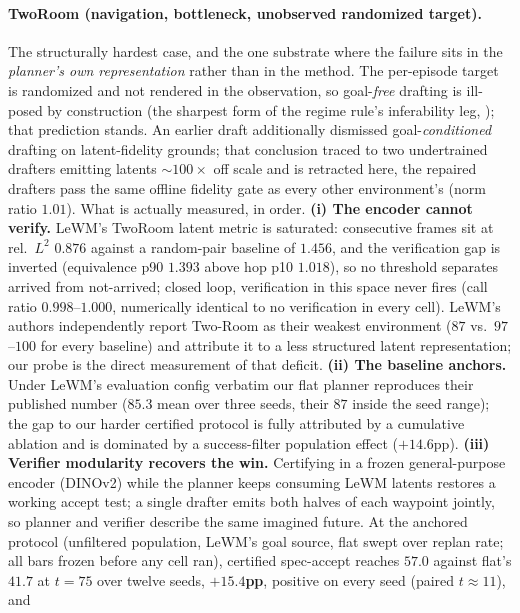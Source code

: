 \documentclass{article}
\begin{document}
\paragraph{TwoRoom (navigation, bottleneck, unobserved randomized target).}
The structurally hardest case, and the one substrate where the failure sits in the
\emph{planner's own representation} rather than in the method. The per-episode
target is randomized and not rendered in the observation, so goal-\emph{free}
drafting is ill-posed by construction (the sharpest form of the regime rule's
inferability leg, ); that prediction stands. An earlier draft
additionally dismissed goal-\emph{conditioned} drafting on latent-fidelity
grounds; that conclusion traced to two undertrained drafters emitting latents
${\sim}100\times$ off scale and is retracted here, the repaired drafters pass the
same offline fidelity gate as every other environment's (norm ratio $1.01$). What
is actually measured, in order. \textbf{(i) The encoder cannot verify.} LeWM's
TwoRoom latent metric is saturated: consecutive frames sit at rel.\ $L^2$ $0.876$
against a random-pair baseline of $1.456$, and the verification gap is inverted
(equivalence p90 $1.393$ above hop p10 $1.018$), so no threshold separates
arrived from not-arrived; closed loop, verification in this space never fires
(call ratio $0.998$--$1.000$, numerically identical to no verification in every
cell). LeWM's authors independently report Two-Room as their weakest environment
($87$ vs.\ $97$--$100$ for every baseline) and attribute it to a less structured
latent representation; our probe is the direct measurement of that deficit.
\textbf{(ii) The baseline anchors.} Under LeWM's evaluation config verbatim our
flat planner reproduces their published number ($85.3$ mean over three seeds,
their $87$ inside the seed range); the gap to our harder certified protocol is
fully attributed by a cumulative ablation and is dominated by a success-filter
population effect ($+14.6$pp). \textbf{(iii) Verifier modularity recovers the win.} Certifying in a frozen
general-purpose encoder (DINOv2) while the planner keeps consuming LeWM latents
restores a working accept test; a single drafter emits both halves of each
waypoint jointly, so planner and verifier describe the same imagined future. At
the anchored protocol (unfiltered population, LeWM's goal source, flat swept
over replan rate; all bars frozen before any cell ran), certified spec-accept
reaches $57.0$ against flat's $41.7$ at $t{=}75$ over twelve seeds,
$\mathbf{+15.4}$\textbf{pp}, positive on every seed (paired $t{\approx}11$), and
\end{document}
